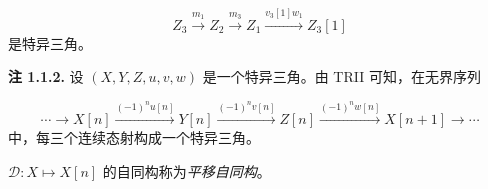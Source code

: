 \[
  Z_3\xrightarrow{m_1}Z_2\xrightarrow{m_3}Z_1
  \xrightarrow{v_3[1]w_1}Z_3[1]
\]
是特异三角。

\medskip
\noindent\textbf{注 1.1.2.}\quad
设 $(X,Y,Z,u,v,w)$ 是一个特异三角。由 TRII 可知，在无界序列

\[
  \cdots\longrightarrow X[n]
  \xrightarrow{(-1)^n u[n]}Y[n]
  \xrightarrow{(-1)^n v[n]}Z[n]
  \xrightarrow{(-1)^n w[n]}X[n+1]
  \longrightarrow\cdots
\]
中，每三个连续态射构成一个特异三角。

$\mathcal D\colon X\longmapsto X[n]$ 的自同构称为\emph{平移自同构}。
\endgroup
